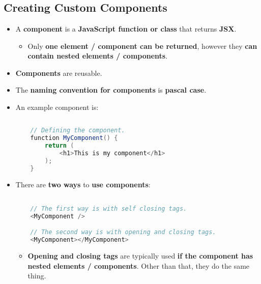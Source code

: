 \documentclass{article}
\begin{document}
    \section*{}

    \subsection*{Creating Custom Components}
    \begin{itemize}
        \item A \textbf{component} is a \textbf{JavaScript function or class} that returns \textbf{JSX}.
        \begin{itemize}
            \item Only \textbf{one element / component can be returned}, however they \textbf{can contain nested elements / components}.
        \end{itemize}
        \item \textbf{Components} are reusable.
        \item The \textbf{naming convention for components} is \textbf{pascal case}.
        \item An example component is:
        \begin{lstlisting}[language=Java]
            
    // Defining the component.
    function MyComponent() {
        return (
            <h1>This is my component</h1>
        );
    }
        \end{lstlisting}
        \item There are \textbf{two ways} to \textbf{use components}:
        \begin{lstlisting}[language=Java]

    // The first way is with self closing tags.
    <MyComponent />

    // The second way is with opening and closing tags.
    <MyComponent></MyComponent>
        \end{lstlisting}
        \begin{itemize}
            \item \textbf{Opening and closing tags} are typically used \textbf{if the component has nested elements / components}. Other than that, they do the same thing.
        \end{itemize}
    \end{itemize}
\end{document}
